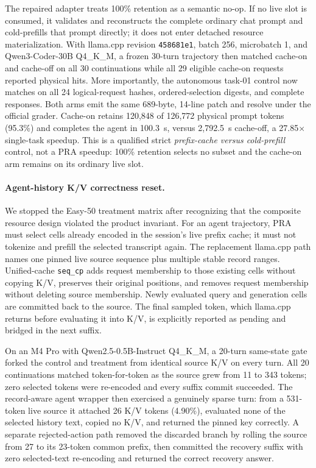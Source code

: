 \documentclass[11pt]{article}
\begin{document}
The repaired adapter treats 100\% retention as a semantic no-op. If no live
slot is consumed, it validates and reconstructs the complete ordinary chat
prompt and cold-prefills that prompt directly; it does not enter detached
resource materialization. With llama.cpp revision \texttt{458681e1}, batch 256,
microbatch 1, and Qwen3-Coder-30B Q4\_K\_M, a frozen 30-turn trajectory then
matched cache-on and cache-off on all 30 continuations while all 29 eligible
cache-on requests reported physical hits. More importantly, the autonomous
task-01 control now matches on all 24 logical-request hashes, ordered-selection
digests, and complete responses. Both arms emit the same 689-byte, 14-line
patch and resolve under the official grader. Cache-on retains 120,848 of
126,772 physical prompt tokens (95.3\%) and completes the agent in 100.3~s,
versus 2,792.5~s cache-off, a 27.85$\times$ single-task speedup. This is a
qualified strict \emph{prefix-cache versus cold-prefill} control, not a PRA
speedup: 100\% retention selects no subset and the cache-on arm remains on its
ordinary live slot.

\paragraph{Agent-history K/V correctness reset.}
We stopped the Easy-50 treatment matrix after recognizing that the composite
resource design violated the product invariant. For an agent trajectory, PRA
must select cells already encoded in the session's live prefix cache; it must
not tokenize and prefill the selected transcript again. The replacement
llama.cpp path names one pinned live source sequence plus multiple stable
record ranges. Unified-cache \texttt{seq\_cp} adds request membership to those
existing cells without copying K/V, preserves their original positions, and
removes request membership without deleting source membership. Newly evaluated
query and generation cells are committed back to the source. The final sampled
token, which llama.cpp returns before evaluating it into K/V, is explicitly
reported as pending and bridged in the next suffix.

On an M4 Pro with Qwen2.5-0.5B-Instruct Q4\_K\_M, a 20-turn same-state gate
forked the control and treatment from identical source K/V on every turn. All
20 continuations matched token-for-token as the source grew from 11 to 343
tokens; zero selected tokens were re-encoded and every suffix commit succeeded.
The record-aware agent wrapper then exercised a genuinely sparse turn: from a
531-token live source it attached 26 K/V tokens (4.90\%), evaluated none of the
selected history text, copied no K/V, and returned the pinned key correctly.
A separate rejected-action path removed the discarded branch by rolling the
source from 27 to its 23-token common prefix, then committed the recovery suffix
with zero selected-text re-encoding and returned the correct recovery answer.
\end{document}
